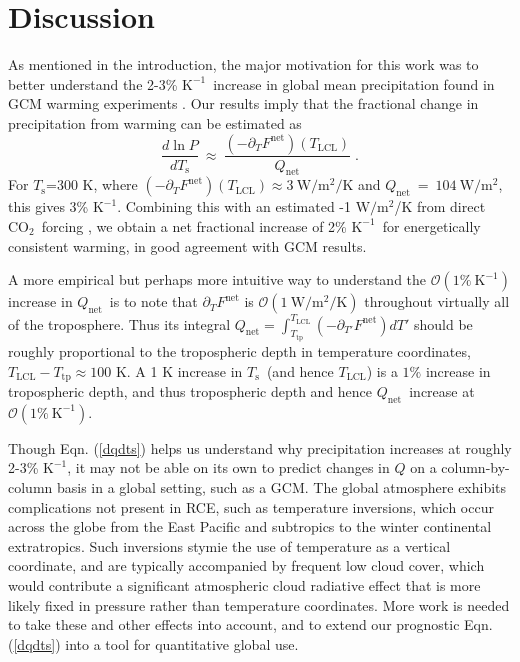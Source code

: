 \documentclass[10pt]{article}
\newcommand{\beqn}{\begin{equation}}
\newcommand{\eeqn}{\end{equation}}
\newcommand{\eqnref}[1]{(\ref{#1})}
\newcommand{\ppt}{\ensuremath{\partial_T}}
\newcommand{\cotwo}{\ensuremath{\mathrm{CO_2}}}
\newcommand{\Qnet}{\ensuremath{Q_\mathrm{net}}}
\newcommand{\Fnet}{\ensuremath{F^\mathrm{net}}}
\newcommand{\tauk}{\ensuremath{\tau_k}}
\newcommand{\Wmsq}{\ensuremath{\mathrm{W/m^2}}}
\newcommand{\rhov}{\ensuremath{\rho_\mathrm{v}}}
\newcommand{\Ts}{\ensuremath{T_\mathrm{s}}}
\newcommand{\Tlcl}{\ensuremath{T_\mathrm{LCL}}}
\newcommand{\Ttp}{\ensuremath{T_\mathrm{tp}}}
\newcommand{\Kinverse}{\ensuremath{\mathrm{K^{-1}}}}
\begin{document}

\section{Discussion} \label{sec_summary}

As mentioned in the introduction, the major motivation for this work was to better understand the 2-3\% \Kinverse\ increase in global mean precipitation found in GCM warming experiments \citep{stephens2008, lambert2008,held2006}.  Our results imply that the fractional change in precipitation from warming can be estimated as 
	\beqn
		\frac{d \ln  P}{d \Ts} \ \approx\  \frac{(-\ppt \Fnet)(\Tlcl)}{\Qnet} \; .
	\label{precip_estimate}
	\eeqn
For \Ts=300 K, where $(-\ppt \Fnet)(\Tlcl) \approx 3 \ \Wmsq/\mathrm{K}$ and $\Qnet\ =\  104\ \Wmsq$, this  gives  3\% \Kinverse. Combining this with an estimated -1 \Wmsq/K from direct \cotwo\ forcing \citep{pendergrass2014}, we obtain a net fractional increase of 2\% \Kinverse\ for energetically consistent warming, in good agreement with GCM results.

A more empirical but perhaps more intuitive way to understand the $\mathcal{O}(1 \%\ \Kinverse)$ increase in \Qnet\ is to note that $\ppt \Fnet$ is $\mathcal{O}(1\ \Wmsq/\mathrm{K})$ throughout virtually all of the troposphere. Thus its integral $\Qnet =  \int_{\Ttp}^{\Tlcl} (-\partial_{T'} \Fnet) dT'$  should be roughly proportional to the tropospheric depth in temperature coordinates, $\Tlcl - \Ttp \approx 100$ K.  A 1 K increase in \Ts\ (and hence \Tlcl) is a $1\%$ increase in tropospheric depth, and thus tropospheric depth and hence \Qnet\  increase at  $\mathcal{O}(1 \%\ \Kinverse)$.

Though Eqn. \eqnref{dqdts} helps us understand why precipitation increases at roughly 2-3\% \Kinverse, it may not be able on its own to predict changes in $Q$ on a column-by-column basis in a global setting, such as a GCM. The global atmosphere exhibits complications not present in RCE, such as  temperature inversions, which occur across the globe from the East Pacific and subtropics to the winter continental extratropics. Such inversions stymie the use of temperature as a vertical coordinate, and are typically accompanied by frequent low cloud cover, which would contribute a significant atmospheric cloud radiative effect that is more likely fixed in pressure rather than temperature coordinates. More work is needed to take these and other effects into account, and to extend our prognostic Eqn. \eqnref{dqdts} into a tool for quantitative global use.
\end{document}
